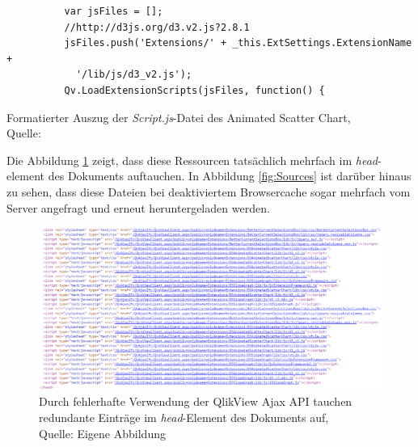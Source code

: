 \begin{appendix}
\begin{listing}[htbp]
\begin{verbatim}
          var jsFiles = [];
          //http://d3js.org/d3.v2.js?2.8.1
          jsFiles.push('Extensions/' + _this.ExtSettings.ExtensionName +
            '/lib/js/d3_v2.js');
          Qv.LoadExtensionScripts(jsFiles, function() {
\end{verbatim}
\caption[Formatierter Auszug der \textit{Script.js}-Datei des Animated Scatter Chart]{Formatierter Auszug der \textit{Script.js}-Datei des Animated Scatter Chart, \\Quelle: \cite{QlikViewExtensionAnimatedScatterChartSourceCode}}
\label{lst:AnimatedScatterChartScriptJsDatei}
\end{listing}

Die Abbildung \ref{fig:endOfHead} zeigt, dass diese Ressourcen tatsächlich mehrfach im \textit{head}-element des Dokuments auftauchen. In Abbildung \ref{fig:Sources} ist darüber hinaus zu sehen, dass diese Dateien bei deaktiviertem Browsercache sogar mehrfach vom Server angefragt und erneut heruntergeladen werden.

\begin{figure}[htbp]
	\centering
		\includegraphics[width=1.00\textwidth]{img/headRudundant/endOfHead.PNG}
	\caption[Redundante Einträge im \textit{head}-Element des Dokuments]{Durch fehlerhafte Verwendung der QlikView Ajax API tauchen redundante Einträge im \textit{head}-Element des Dokuments auf, \\Quelle: Eigene Abbildung}
	\label{fig:endOfHead}
\end{figure}


\end{appendix}
